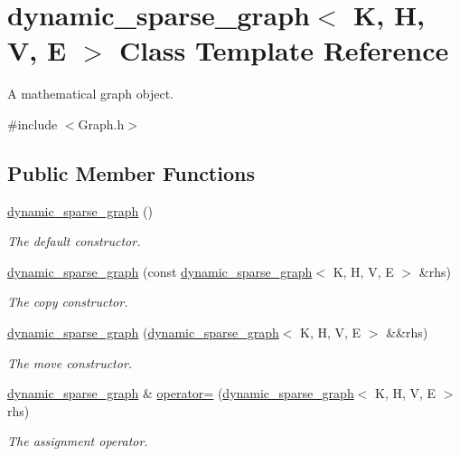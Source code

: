 \hypertarget{classdynamic__sparse__graph}{\section{dynamic\+\_\+sparse\+\_\+graph$<$ K, H, V, E $>$ Class Template Reference}
\label{classdynamic__sparse__graph}
}


A mathematical graph object.  




{\ttfamily \#include $<$Graph.\+h$>$}

\subsection*{Public Member Functions}
\begin{DoxyCompactItemize}
\item 
\hyperlink{classdynamic__sparse__graph_a8655f2ac67ccc28c88585b0274d83dae}{dynamic\+\_\+sparse\+\_\+graph} ()
\begin{DoxyCompactList}\small\item\em The default constructor. \end{DoxyCompactList}\item 
\hyperlink{classdynamic__sparse__graph_a0948114b7972032cff225a02c542e800}{dynamic\+\_\+sparse\+\_\+graph} (const \hyperlink{classdynamic__sparse__graph}{dynamic\+\_\+sparse\+\_\+graph}$<$ K, H, V, E $>$ \&rhs)
\begin{DoxyCompactList}\small\item\em The copy constructor. \end{DoxyCompactList}\item 
\hyperlink{classdynamic__sparse__graph_a2c3b2af233063af6aaf248c321a38edb}{dynamic\+\_\+sparse\+\_\+graph} (\hyperlink{classdynamic__sparse__graph}{dynamic\+\_\+sparse\+\_\+graph}$<$ K, H, V, E $>$ \&\&rhs)
\begin{DoxyCompactList}\small\item\em The move constructor. \end{DoxyCompactList}\item 
\hyperlink{classdynamic__sparse__graph}{dynamic\+\_\+sparse\+\_\+graph} \& \hyperlink{classdynamic__sparse__graph_a6c7f3f46c94242dd69a9d898a87a0d28}{operator=} (\hyperlink{classdynamic__sparse__graph}{dynamic\+\_\+sparse\+\_\+graph}$<$ K, H, V, E $>$ rhs)
\begin{DoxyCompactList}\small\item\em The assignment operator. \end{DoxyCompactList}\item 

\end{DoxyCompactItemize}
